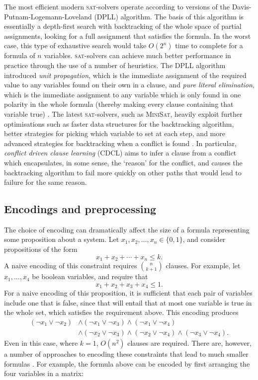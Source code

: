 \documentclass[proof,pdftex,11pt,a4,titlepage]{article}
\newcommand{\sat}{\textsc{sat}}
\begin{document}
The most efficient modern \sat{}-solvers operate according to versions of the Davis-Putnam-Logemann-Loveland (DPLL) algorithm. The basis of this algorithm is essentially a depth-first search with backtracking of the whole space of partial assignments, looking for a full assignment that satisfies the formula. In the worst case, this type of exhaustive search would take $O(2^n)$ time to complete for a formula of $n$ variables. \sat{}-solvers can achieve much better performance in practice through the use of a number of heuristics. The DPLL algorithm introduced \emph{unit propagation}, which is the immediate assignment of the required value to any variables found on their own in a clause, and \emph{pure literal elimination}, which is the immediate assignment to any variable which is only found in one polarity in the whole formula (thereby making every clause containing that variable true) \cite{Davis:1962}. The latest \sat{}-solvers, such as \textsc{MiniSat}, heavily exploit further optimisations such as faster data structures for the backtracking algorithm, better strategies for picking which variable to set at each step, and more advanced strategies for backtracking when a conflict is found \cite{Een:2003}. In particular, \emph{conflict driven clause learning} (CDCL) aims to infer a clause from a conflict which encapsulates, in some sense, the `reason' for the conflict, and causes the backtracking algorithm to fail more quickly on other paths that would lead to failure for the same reason.

\subsection{Encodings and preprocessing}
\label{sec:encoding}

The choice of encoding can dramatically affect the size of a formula representing some proposition about a system. Let $x_1, x_2, \ldots, x_n \in \{0, 1\}$, and consider propositions of the form
\[x_1 + x_2 + \cdots + x_n \leq k.\]
A naive encoding of this constraint requires ${n \choose k+1}$ clauses. For example, let $x_1, \ldots, x_4$ be boolean variables, and require that
\[x_1 + x_2 + x_3 + x_4 \leq 1.\]
For a naive encoding of this proposition, it is sufficient that each pair of variables include one that is false, since that will entail that at most one variable is true in the whole set, which satisfies the requirement above. This encoding produces
\begin{align*}
  (\neg x_1 \vee \neg x_2) & \wedge (\neg x_1 \vee \neg x_3) \wedge (\neg x_1 \vee \neg x_4) \\
  & \wedge (\neg x_2 \vee \neg x_3) \wedge (\neg x_2 \vee \neg x_4) \wedge (\neg x_3 \vee \neg x_4).
\end{align*}
Even in this case, where $k=1$, $O(n^2)$ clauses are required. There are, however, a number of approaches to encoding these constraints that lead to much smaller formulas \cite{Biere:2014}. For example, the formula above can be encoded by first arranging the four variables in a matrix:
\end{document}
